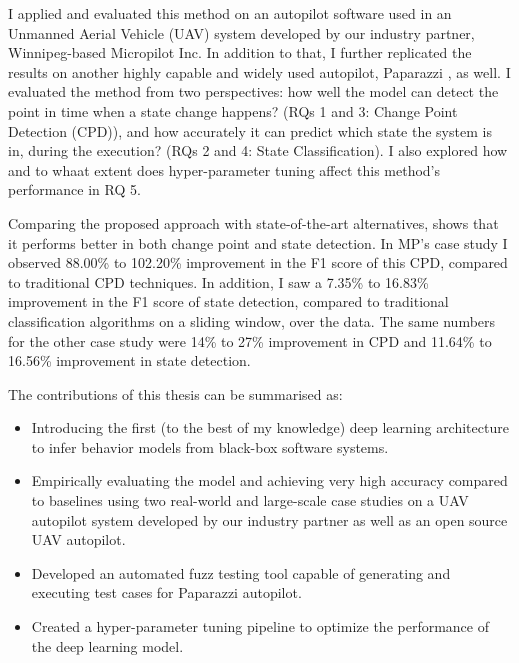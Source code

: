 

I applied and evaluated this method on an autopilot software used in an Unmanned Aerial Vehicle (UAV) system developed by our industry partner, Winnipeg-based Micropilot Inc. In addition to that, I further replicated the results on another highly capable and widely used autopilot, Paparazzi \cite{hattenberger2014using}, as well.
I evaluated the method from two perspectives: how well the model can detect the point in time when a state change happens? (RQs 1 and 3: Change Point Detection (CPD)), and how accurately it can predict which state the system is in, during the execution? (RQs 2 and 4: State Classification). I also explored how and to whaat extent does hyper-parameter tuning affect this method's performance in RQ 5.



Comparing the proposed approach with state-of-the-art alternatives, shows that it performs better in both change point and state detection. In MP's case study I observed 88.00\% to 102.20\% improvement in the F1 score of this CPD, compared to traditional CPD techniques. In addition, I saw a 7.35\% to 16.83\% improvement in the F1 score of state detection, compared to traditional classification algorithms on a sliding window, over the data. 
The same numbers for the other case study were 14\% to 27\% improvement in CPD and 11.64\% to 16.56\% improvement in state detection.


The contributions of this thesis can be summarised as:
\begin{itemize}
    \item Introducing the first (to the best of my knowledge) deep learning architecture to infer behavior models from black-box software systems.
    \item Empirically evaluating the model and achieving very high accuracy compared to baselines using two real-world and large-scale case studies on a UAV autopilot system developed by our industry partner as well as an open source UAV autopilot.
    \item Developed an automated fuzz testing tool capable of generating and executing test cases for Paparazzi autopilot.
    \item Created a hyper-parameter tuning pipeline to optimize the performance of the deep learning model.
\end{itemize}

